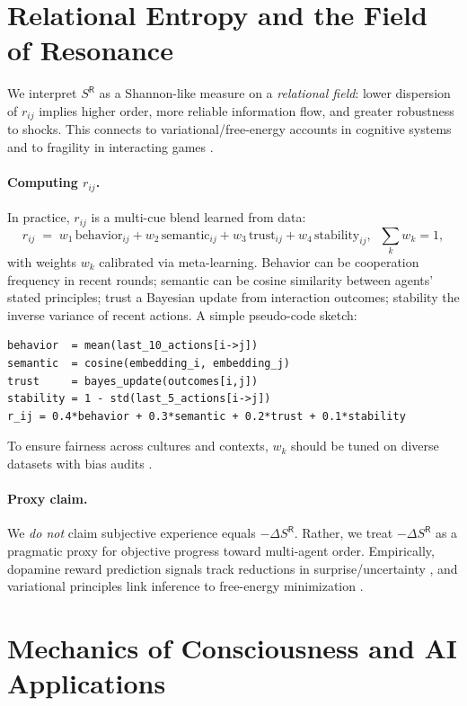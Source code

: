 \documentclass[11pt]{article}
\begin{document}
\section{Relational Entropy and the Field of Resonance}
We interpret $S^{\mathsf{R}}$ as a Shannon-like measure on a \emph{relational field}: lower dispersion of $r_{ij}$ implies higher order, more reliable information flow, and greater robustness to shocks. This connects to variational/free-energy accounts in cognitive systems \cite{Friston2010} and to fragility in interacting games \cite{HauertSzabo2005}.

\paragraph{Computing $r_{ij}$.} In practice, $r_{ij}$ is a multi-cue blend learned from data:
\begin{equation}
r_{ij} \;=\; w_1\,\text{behavior}_{ij} + w_2\,\text{semantic}_{ij} + w_3\,\text{trust}_{ij} + w_4\,\text{stability}_{ij}, \;\; \sum_k w_k = 1,
\end{equation}
with weights $w_k$ calibrated via meta-learning. Behavior can be cooperation frequency in recent rounds; semantic can be cosine similarity between agents' stated principles; trust a Bayesian update from interaction outcomes; stability the inverse variance of recent actions. A simple pseudo-code sketch:
\begin{verbatim}
behavior  = mean(last_10_actions[i->j])
semantic  = cosine(embedding_i, embedding_j)
trust     = bayes_update(outcomes[i,j])
stability = 1 - std(last_5_actions[i->j])
r_ij = 0.4*behavior + 0.3*semantic + 0.2*trust + 0.1*stability
\end{verbatim}
To ensure fairness across cultures and contexts, $w_k$ should be tuned on diverse datasets with bias audits \cite{Floridi2020,Russell2019}.

\paragraph{Proxy claim.} We \emph{do not} claim subjective experience equals $-\Delta S^{\mathsf{R}}$. Rather, we treat $-\Delta S^{\mathsf{R}}$ as a pragmatic proxy for objective progress toward multi-agent order. Empirically, dopamine reward prediction signals track reductions in surprise/uncertainty \cite{Schultz1998}, and variational principles link inference to free-energy minimization \cite{Friston2010}.

\section{Mechanics of Consciousness and AI Applications}
\end{document}
